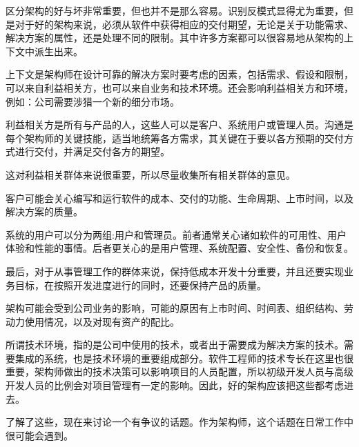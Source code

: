 
区分架构的好与坏非常重要，但也并不是那么容易。识别反模式显得尤为重要，但是对于好的架构来说，必须从软件中获得相应的交付期望，无论是关于功能需求、解决方案的属性，还是处理不同的限制。其中许多方案都可以很容易地从架构的上下文中派生出来。


上下文是架构师在设计可靠的解决方案时要考虑的因素，包括需求、假设和限制，可以来自利益相关方，也可以来自业务和技术环境。还会影响利益相关方和环境，例如：公司需要涉猎一个新的细分市场。


利益相关方是所有与产品的人，这些人可以是客户、系统用户或管理人员。沟通是每个架构师的关键技能，适当地统筹各方需求，其关键在于要以各方预期的交付方式进行交付，并满足交付各方的期望。

这对利益相关群体来说很重要，所以尽量收集所有相关群体的意见。

客户可能会关心编写和运行软件的成本、交付的功能、生命周期、上市时间，以及解决方案的质量。

系统的用户可以分为两组:用户和管理员。前者通常关心诸如软件的可用性、用户体验和性能的事情。后者更关心的是用户管理、系统配置、安全性、备份和恢复。

最后，对于从事管理工作的群体来说，保持低成本开发十分重要，并且还要实现业务目标，在按照开发进度进行的同时，还要保持产品的质量。


架构可能会受到公司业务的影响，可能的原因有上市时间、时间表、组织结构、劳动力使用情况，以及对现有资产的配比。

所谓技术环境，指的是公司中使用的技术，或者出于需要成为解决方案的技术。需要集成的系统，也是技术环境的重要组成部分。软件工程师的技术专长在这里也很重要，架构师做出的技术决策可以影响项目的人员配置，所以初级开发人员与高级开发人员的比例会对项目管理有一定的影响。因此，好的架构应该把这些都考虑进去。

了解了这些，现在来讨论一个有争议的话题。作为架构师，这个话题在日常工作中很可能会遇到。















